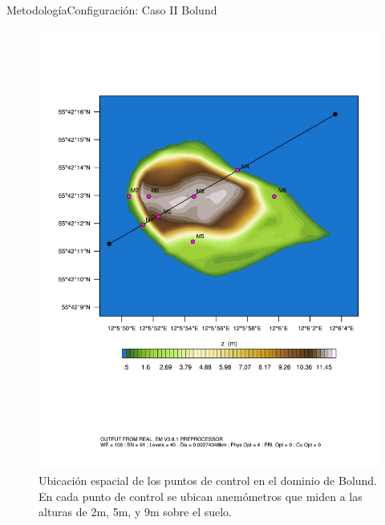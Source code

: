 \documentclass[mathserif,10pt]{beamer}
\begin{document}
\begin{frame}{Metodología}{Configuración: Caso II Bolund}
	\begin{figure}[H]
		\centering
		\includegraphics[width=0.75\linewidth,page=1,trim={0cm 6cm -1cm 4cm},clip]{fig/05/bol_control_point.pdf}%
		\vspace{-2mm}
		\caption{Ubicación espacial de los puntos de control en el dominio de Bolund. En cada punto de control se ubican anemómetros que miden a las alturas de 2m, 5m, y 9m sobre el suelo.}
		\label{fig:05_d08_bol}
	\end{figure}
\end{frame}
\end{document}

